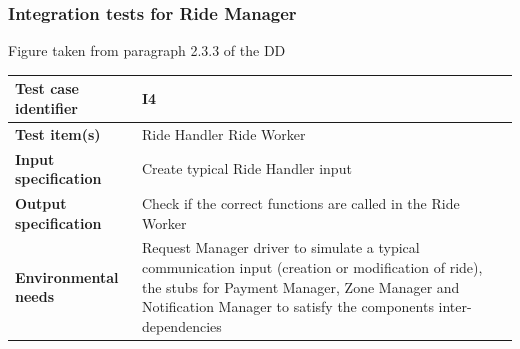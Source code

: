 \documentclass[a4paper,11pt]{report} %
\begin{document}
		\subsubsection{Integration tests for Ride Manager} \label{sec:3.1.3}
			\begin{minipage}{\linewidth}
			\end{minipage}
			\begin{center}
				Figure taken from paragraph 2.3.3 of the DD
			\end{center} 
			\begin{center}
				\renewcommand{\arraystretch}{1.2}
				\setlength{\tabcolsep}{24pt}
				\begin{tabular}{ l  p{9cm}}\hline
					\textbf{Test case identifier} & I4\\\hline
					\textbf{Test item(s)} & Ride Handler \textrightarrow Ride Worker\\\hline
					\textbf{Input specification} & Create typical Ride Handler input \\\hline
					\textbf{Output specification} & Check if the correct functions are called in the Ride Worker\\\hline
					\textbf{Environmental needs} & Request Manager driver to simulate a typical communication input (creation or modification of ride), the stubs for Payment Manager, Zone Manager and Notification Manager to satisfy the components inter-dependencies\\\hline
				\end{tabular}
			\end{center}	
			\bigskip	
\end{document}
